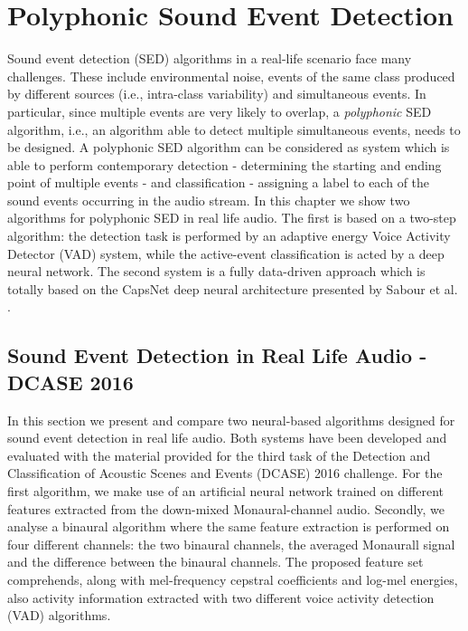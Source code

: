 \chapter{Polyphonic Sound Event Detection}
\label{ch:polySED}

Sound event detection (SED) algorithms in a real-life scenario face many challenges. These include  environmental noise, events of the same class produced by different sources (i.e., intra-class variability) and simultaneous events. In particular, since multiple events are very likely to overlap, a \textit{polyphonic} SED algorithm, i.e., an algorithm able to detect multiple simultaneous events, needs to be designed. A polyphonic SED algorithm can be considered as system which is able to perform contemporary detection - determining the starting and ending point of multiple events - and classification - assigning a label to each of the sound events occurring in the audio stream. In this chapter we show two algorithms for polyphonic SED in real life audio. The first is based on a two-step algorithm: the detection task is performed by an adaptive energy Voice Activity Detector (VAD) system, while the active-event classification is acted by a deep neural network. The second system is a fully data-driven approach which is totally based on the CapsNet deep neural architecture presented by Sabour et al. \cite{sabour2017dynamic}. 
\vspace{-0.5cm}
\section{Sound Event Detection in Real Life Audio - DCASE 2016}
\label{sec:sed_dcase2016}
In this section we present and compare two neural-based algorithms designed for sound event detection in real life audio. Both systems have been developed and evaluated with the material provided for the third task of the Detection and Classification of Acoustic Scenes and Events (DCASE) 2016 challenge. For the first algorithm, we make use of an artificial neural network trained on different features extracted from the down-mixed Monaural-channel audio. Secondly, we analyse a binaural algorithm where the same feature extraction is performed on four different channels: the two binaural channels, the averaged Monaurall signal and the difference between the binaural channels. The proposed feature set comprehends, along with mel-frequency cepstral coefficients and log-mel energies, also activity information extracted with two different voice activity detection (VAD) algorithms.

